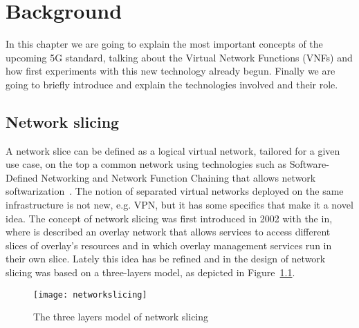 \chapter{Background}
\label{chap:background}

In this chapter we are going to explain the most important concepts of the 
upcoming 5G standard, talking about the Virtual Network Functions (VNFs) and 
how first experiments with this new technology already begun. Finally we are 
going to briefly introduce and explain the technologies involved and their role.

\section{Network slicing}
A network slice can be defined as a logical virtual network, tailored for a
given use case, on the top a common network using technologies such as
Software-Defined Networking and Network Function Chaining that allows network
softwarization~\cite{ordonez2017network}. The notion of separated virtual
networks deployed on the same infrastructure is not new, e.g. VPN, but it has
some specifics that make it a novel idea. The concept of network slicing was
first introduced in 2002 with the in\cite{peterson2003blueprint}, where
is described an overlay network that allows services to access different slices
of overlay's resources and in which overlay management services run in their
own slice. Lately this idea has be refined  and
in\cite{alliance2016description} the design of network slicing was based on a
three-layers model, as depicted in
Figure~\ref{chap:background:img:network_slicing}.

\begin{figure}
  \centering
  \texttt{[image: networkslicing]}
  \caption{The three layers model of network slicing}
  \label{chap:background:img:network_slicing}
\end{figure}

